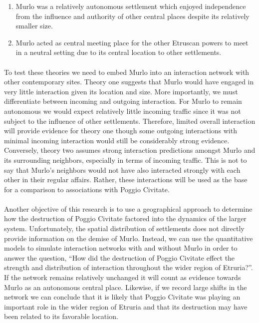 \documentclass[12pt,a4paper]{thesis}
\begin{document}
	\begin{enumerate}
	\item Murlo was a relatively autonomous settlement which enjoyed independence from the influence and authority of other central places despite its relatively smaller size.
	\item Murlo acted as central meeting place for the other Etruscan powers to meet in a neutral setting due to its central location to other settlements. 
	\end{enumerate}

\paragraph{}
To test these theories we need to embed Murlo into an interaction network with other contemporary sites. Theory one suggests that Murlo would have engaged in very little interaction given its location and size. More importantly, we must differentiate between incoming and outgoing interaction. For Murlo to remain autonomous we would expect relatively little incoming traffic since it was not subject to the influence of other settlements. Therefore, limited overall interaction will provide evidence for theory one though some outgoing interactions with minimal incoming interaction would still be considerably strong evidence. Conversely, theory two assumes strong interaction predictions amongst Murlo and its surrounding neighbors, especially in terms of incoming traffic. This is not to say that Murlo's neighbors would not have also interacted strongly with each other in their regular affairs. Rather, these interactions will be used as the base for a comparison to associations with Poggio Civitate.

\paragraph{}
Another objective of this research is to use a geographical approach to determine how the destruction of Poggio Civitate factored into the dynamics of the larger system. Unfortunately, the spatial distribution of settlements does not directly provide information on the demise of Murlo. Instead, we can use the quantitative models to simulate interaction networks with and without Murlo in order to answer the question, ``How did the destruction of Poggio Civitate effect the strength and distribution of interaction throughout the wider region of Etruria?''. If the network remains relatively unchanged it will count as evidence towards Murlo as an autonomous central place. Likewise, if we record large shifts in the network we can conclude that it is likely that Poggio Civitate was playing an important role in the wider region of Etruria and that its destruction may have been related to its favorable location. 
\end{document}
